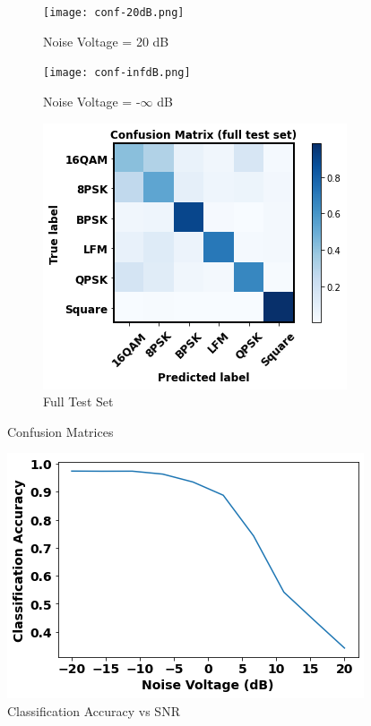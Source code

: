 \documentclass{article}
\begin{document}
\begin{figure}[H]
    \centering
    \begin{subfigure}[b]{0.3\textwidth}
        \centering
        \texttt{[image: conf-20dB.png]}
        \caption{Noise Voltage = 20 dB}
        \label{fig:noise voltage = 20 dB}
    \end{subfigure}
    \hfill
    \begin{subfigure}[b]{0.3\textwidth}
        \centering
        \texttt{[image: conf-infdB.png]}
        \caption{Noise Voltage = -$\infty$ dB}
        \label{fig:noise voltage = 0}
    \end{subfigure}
    \hfill
    \begin{subfigure}[b]{0.3\textwidth}
        \centering
        \includegraphics[width=\textwidth]{conf-full.png}
        \caption{Full Test Set}
        \label{fig:full test set}
    \end{subfigure}
       \caption{Confusion Matrices}
       \label{fig:confusion}
\end{figure}

\begin{figure}[H]
    \centering
    \includegraphics[width=0.45\linewidth]{classification-accuracy.png}
    \caption{Classification Accuracy vs SNR}
    \label{fig:classification accuracy}
\end{figure}
\end{document}
